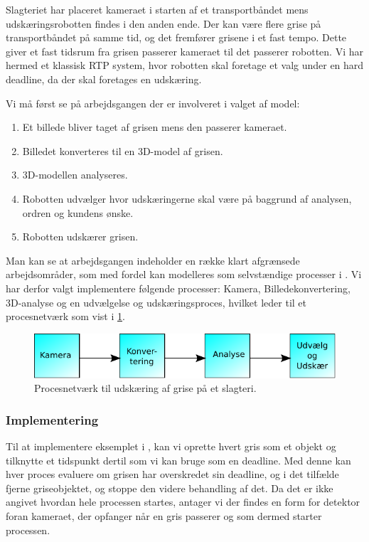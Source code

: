 Slagteriet har placeret kameraet i starten af et transportbåndet mens udskæringsrobotten findes i den anden ende. Der kan være flere grise på transportbåndet på samme tid, og det fremfører grisene i et fast tempo. Dette giver et fast tidsrum fra grisen passerer kameraet til det passerer robotten. Vi har hermed et klassisk RTP system, hvor robotten skal foretage et valg under en hard deadline, da der skal foretages en udskæring.

Vi må først se på arbejdsgangen der er involveret i valget af model:
\begin{enumerate}
\tightlist
	\item Et billede bliver taget af grisen mens den passerer kameraet.
	\item Billedet konverteres til en 3D-model af grisen.
	\item 3D-modellen analyseres.
	\item Robotten udvælger hvor udskæringerne skal være på baggrund af analysen, ordren og kundens ønske.
	\item Robotten udskærer grisen.
\end{enumerate}

Man kan se at arbejdsgangen indeholder en  række klart afgrænsede arbejdsområder, som med fordel kan modelleres som selvstændige processer i \pycsp.  Vi har derfor valgt implementere følgende processer: Kamera, Billedekonvertering, 3D-analyse og en udvælgelse og udskæringsproces, hvilket leder til et procesnetværk som vist i \cref{fig:pig-network}.

\begin{figure}
 \begin{center}
  \includegraphics[scale=1]{images/pig-network}
	\caption{Procesnetværk til udskæring af grise på et slagteri.}
	\label{fig:pig-network}
\end{center}
\end{figure}

\subsubsection*{Implementering}\label{sec:deadline-exampel-implementation}
Til at implementere eksemplet i \pycsp, kan vi oprette hvert gris som et objekt og tilknytte et tidspunkt dertil som vi kan bruge som en deadline. Med denne kan hver proces evaluere om grisen har overskredet sin deadline, og i det tilfælde fjerne griseobjektet, og stoppe den videre behandling af det. Da det er ikke angivet hvordan hele processen startes,  antager vi der findes en form for detektor foran kameraet, der opfanger når en gris passerer og som dermed starter processen. 

